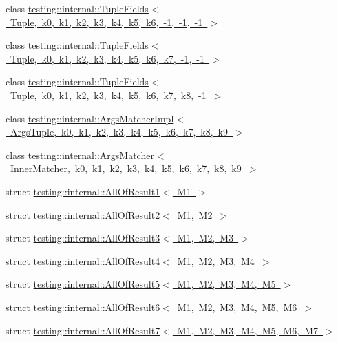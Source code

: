 \begin{DoxyCompactItemize}
\item 
class \mbox{\hyperlink{classtesting_1_1internal_1_1TupleFields_3_01Tuple_00_01k0_00_01k1_00_01k2_00_01k3_00_01k4_00_01keabdf503bd0192bc35ddb795df95316f}{testing\+::internal\+::\+Tuple\+Fields$<$ Tuple, k0, k1, k2, k3, k4, k5, k6, -\/1, -\/1, -\/1 $>$}}
\item 
class \mbox{\hyperlink{classtesting_1_1internal_1_1TupleFields_3_01Tuple_00_01k0_00_01k1_00_01k2_00_01k3_00_01k4_00_01kb66bdb5aa3faae197a495470a1b8e9d1}{testing\+::internal\+::\+Tuple\+Fields$<$ Tuple, k0, k1, k2, k3, k4, k5, k6, k7, -\/1, -\/1 $>$}}
\item 
class \mbox{\hyperlink{classtesting_1_1internal_1_1TupleFields_3_01Tuple_00_01k0_00_01k1_00_01k2_00_01k3_00_01k4_00_01k478398ee7a3c50306b8ce1483964573e}{testing\+::internal\+::\+Tuple\+Fields$<$ Tuple, k0, k1, k2, k3, k4, k5, k6, k7, k8, -\/1 $>$}}
\item 
class \mbox{\hyperlink{classtesting_1_1internal_1_1ArgsMatcherImpl}{testing\+::internal\+::\+Args\+Matcher\+Impl$<$ Args\+Tuple, k0, k1, k2, k3, k4, k5, k6, k7, k8, k9 $>$}}
\item 
class \mbox{\hyperlink{classtesting_1_1internal_1_1ArgsMatcher}{testing\+::internal\+::\+Args\+Matcher$<$ Inner\+Matcher, k0, k1, k2, k3, k4, k5, k6, k7, k8, k9 $>$}}
\item 
struct \mbox{\hyperlink{structtesting_1_1internal_1_1AllOfResult1}{testing\+::internal\+::\+All\+Of\+Result1$<$ M1 $>$}}
\item 
struct \mbox{\hyperlink{structtesting_1_1internal_1_1AllOfResult2}{testing\+::internal\+::\+All\+Of\+Result2$<$ M1, M2 $>$}}
\item 
struct \mbox{\hyperlink{structtesting_1_1internal_1_1AllOfResult3}{testing\+::internal\+::\+All\+Of\+Result3$<$ M1, M2, M3 $>$}}
\item 
struct \mbox{\hyperlink{structtesting_1_1internal_1_1AllOfResult4}{testing\+::internal\+::\+All\+Of\+Result4$<$ M1, M2, M3, M4 $>$}}
\item 
struct \mbox{\hyperlink{structtesting_1_1internal_1_1AllOfResult5}{testing\+::internal\+::\+All\+Of\+Result5$<$ M1, M2, M3, M4, M5 $>$}}
\item 
struct \mbox{\hyperlink{structtesting_1_1internal_1_1AllOfResult6}{testing\+::internal\+::\+All\+Of\+Result6$<$ M1, M2, M3, M4, M5, M6 $>$}}
\item 
struct \mbox{\hyperlink{structtesting_1_1internal_1_1AllOfResult7}{testing\+::internal\+::\+All\+Of\+Result7$<$ M1, M2, M3, M4, M5, M6, M7 $>$}}
\item 

\end{DoxyCompactItemize}
